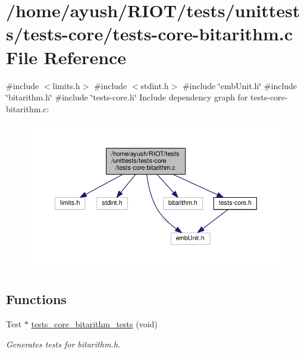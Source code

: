 \hypertarget{tests-core-bitarithm_8c}{}\section{/home/ayush/\+R\+I\+O\+T/tests/unittests/tests-\/core/tests-\/core-\/bitarithm.c File Reference}
\label{tests-core-bitarithm_8c}
{\ttfamily \#include $<$limits.\+h$>$}\newline
{\ttfamily \#include $<$stdint.\+h$>$}\newline
{\ttfamily \#include \char`\"{}emb\+Unit.\+h\char`\"{}}\newline
{\ttfamily \#include \char`\"{}bitarithm.\+h\char`\"{}}\newline
{\ttfamily \#include \char`\"{}tests-\/core.\+h\char`\"{}}\newline
Include dependency graph for tests-\/core-\/bitarithm.c\+:
\nopagebreak
\begin{figure}[H]
\begin{center}
\leavevmode
\includegraphics[width=350pt]{tests-core-bitarithm_8c__incl}
\end{center}
\end{figure}
\subsection*{Functions}
\begin{DoxyCompactItemize}
\item 
Test $\ast$ \hyperlink{group__unittests_ga0e92d30389bd2bf5e8482efa37e34733}{tests\+\_\+core\+\_\+bitarithm\+\_\+tests} (void)
\begin{DoxyCompactList}\small\item\em Generates tests for bitarithm.\+h. \end{DoxyCompactList}\end{DoxyCompactItemize}
